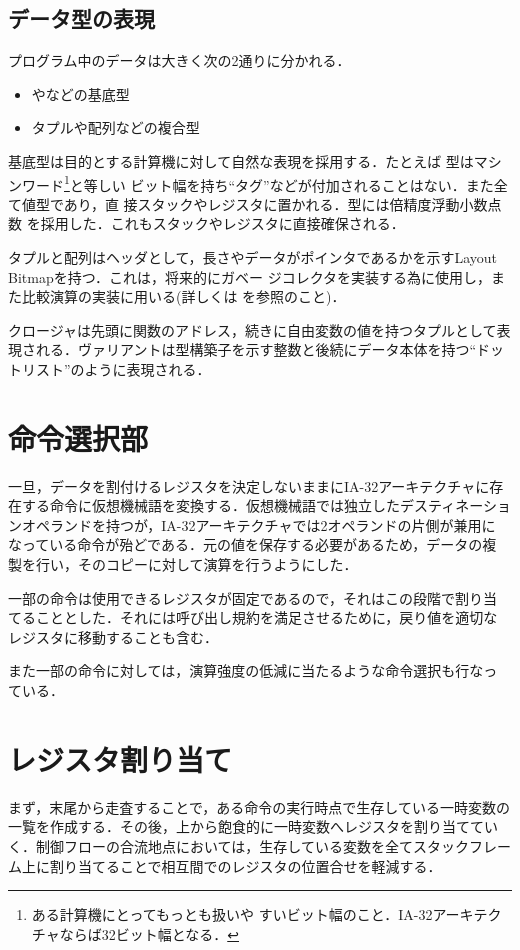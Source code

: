 \documentclass[a4paper,titlepage,disablejfam]{jsbook}
\begin{document}
\subsection{データ型の表現}
プログラム中のデータは大きく次の2通りに分かれる．
\begin{itemize}
 \item {}やなどの基底型
 \item タプルや配列などの複合型
\end{itemize}

基底型は目的とする計算機に対して自然な表現を採用する．たとえば
型はマシンワード\footnote{ある計算機にとってもっとも扱いや
すいビット幅のこと．IA-32アーキテクチャならば32ビット幅となる．}と等しい
ビット幅を持ち``タグ''などが付加されることはない．また全て値型であり，直
接スタックやレジスタに置かれる．型には倍精度浮動小数点数
を採用した．これもスタックやレジスタに直接確保される．

タプルと配列はヘッダとして，長さやデータがポインタであるかを示すLayout
Bitmap\cite{Nguyen:2006:CMP:1140335.1140364}を持つ．これは，将来的にガベー
ジコレクタを実装する為に使用し，また比較演算の実装に用いる(詳しくは
を参照のこと)．

クロージャは先頭に関数のアドレス，続きに自由変数の値を持つタプルとして表
現される．ヴァリアントは型構築子を示す整数と後続にデータ本体を持つ``ドッ
トリスト''のように表現される．


\section{命令選択部}\label{sc:impl-inst}
 一旦，データを割付けるレジスタを決定しないままにIA-32アーキテクチャに存
 在する命令に仮想機械語を変換する．仮想機械語では独立したデスティネーショ
 ンオペランドを持つが，IA-32アーキテクチャでは2オペランドの片側が兼用に
 なっている命令が殆どである．元の値を保存する必要があるため，データの複
 製を行い，そのコピーに対して演算を行うようにした．

 一部の命令は使用できるレジスタが固定であるので，それはこの段階で割り当
 てることとした．それには呼び出し規約を満足させるために，戻り値を適切な
 レジスタに移動することも含む．

 また一部の命令に対しては，演算強度の低減に当たるような命令選択も行なっ
 ている．


\section{レジスタ割り当て}\label{sc:impl-regalloc}
 まず，末尾から走査することで，ある命令の実行時点で生存している一時変数の
 一覧を作成する．その後，上から飽食的に一時変数へレジスタを割り当ててい
 く．制御フローの合流地点においては，生存している変数を全てスタックフレー
 ム上に割り当てることで相互間でのレジスタの位置合せを軽減する．
\end{document}

